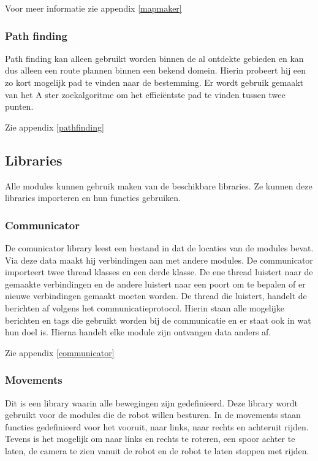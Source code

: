 \documentclass[a4paper,10pt]{article}
\begin{document}
Voor meer informatie zie appendix \ref{mapmaker}

\subsubsection{Path finding}
Path finding kan alleen gebruikt worden binnen de al ontdekte gebieden en kan dus alleen een route plannen binnen een bekend domein. Hierin probeert hij een zo kort mogelijk pad te vinden naar de bestemming. Er wordt gebruik gemaakt van het A ster zoekalgoritme om het effici\"{e}ntste pad te vinden tussen twee punten.

Zie appendix \ref{pathfinding}

\subsection{Libraries}
Alle modules kunnen gebruik maken van de beschikbare libraries. Ze kunnen deze libraries importeren en hun functies gebruiken.

\subsubsection{Communicator}
De comunicator library leest een bestand in dat de locaties van de modules bevat. Via deze data maakt hij verbindingen aan met andere modules. De communicator importeert twee thread klasses en een derde klasse. De ene thread luistert naar de gemaakte verbindingen en de andere luistert naar een poort om te bepalen of er nieuwe verbindingen gemaakt moeten worden. De thread die luistert, handelt de berichten af volgens het communicatieprotocol. Hierin staan alle mogelijke berichten en tags die gebruikt worden bij de communicatie en er staat ook in wat hun doel is. Hierna handelt elke module zijn ontvangen data anders af.

Zie appendix \ref{communicator}

\subsubsection{Movements}
Dit is een library waarin alle bewegingen zijn gedefinieerd. Deze library wordt gebruikt voor de modules die de robot willen besturen. In de movements staan functies gedefinieerd voor het vooruit, naar links, naar rechts en achteruit rijden. Tevens is het mogelijk om naar links en rechts te roteren, een spoor achter te laten, de camera te zien vanuit de robot en de robot te laten stoppen met rijden.
\end{document}
